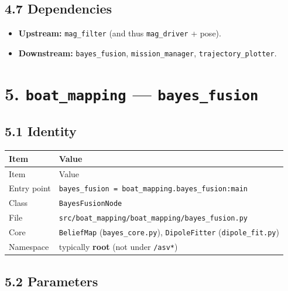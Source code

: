 \subsection{4.7 Dependencies}


\begin{itemize}[leftmargin=*]
\item \textbf{Upstream:} \texttt{mag\_filter} (and thus \texttt{mag\_driver} + pose).
\item \textbf{Downstream:} \texttt{bayes\_fusion}, \texttt{mission\_manager}, \texttt{trajectory\_plotter}.
\end{itemize}




\section{5. \texttt{boat\_mapping} --- \texttt{bayes\_fusion}}


\subsection{5.1 Identity}


\begin{center}
\small
\begin{longtable}{@{}lp{10cm}@{}}
\toprule
Item & Value \\
\midrule
\endfirsthead
\toprule
Item & Value \\
\midrule
\endhead
Entry point & \texttt{bayes\_fusion = boat\_mapping.bayes\_fusion:main} \\
Class & \texttt{BayesFusionNode} \\
File & \texttt{src/boat\_mapping/boat\_mapping/bayes\_fusion.py} \\
Core & \texttt{BeliefMap} (\texttt{bayes\_core.py}), \texttt{DipoleFitter} (\texttt{dipole\_fit.py}) \\
Namespace & typically \textbf{root} (not under \texttt{/asv*}) \\
\bottomrule
\end{longtable}
\end{center}


\subsection{5.2 Parameters}


